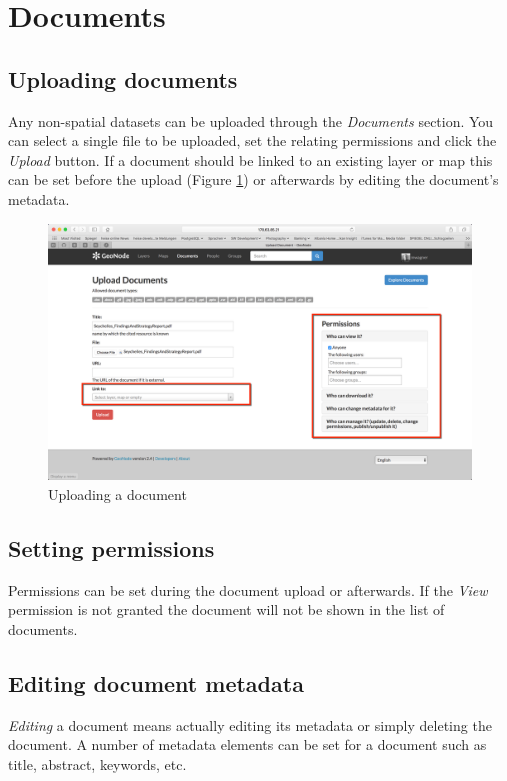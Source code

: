 \documentclass[a4paper,12pt,titlepage]{article}
\begin{document}
\section{Documents}

\subsection{Uploading documents}

Any non-spatial datasets can be uploaded through the \textit{Documents} section.
You can select a single file to be uploaded, set the relating permissions and click the \textit{Upload} button. If a document should be linked to an existing layer or map this can be set before the upload (Figure \ref*{fig:geonode_5}) or afterwards by editing the document's metadata.
 
\begin{figure}[H]
	\centering
	\includegraphics[width=12cm]{Images/geonode_5.png}
	\caption{Uploading a document}\label{fig:geonode_5}
\end{figure}

\subsection{Setting permissions}

Permissions can be set during the document upload or afterwards. If the \textit{View} permission is not granted the document will not be shown in the list of documents.

\subsection{Editing document metadata}

\textit{Editing} a document means actually editing its metadata or simply deleting the document. A number of metadata elements can be set for a document such as title, abstract, keywords, etc.
\end{document}
